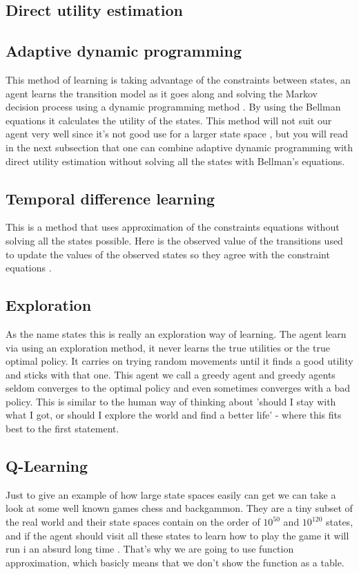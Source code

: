 			
\subsection*{Direct utility estimation}


\subsection*{Adaptive dynamic programming}\label{ADP}
This method of learning is taking advantage of the constraints between states, an agent learns the transition model as it goes along and solving the Markov decision process \cite{mdp} using a dynamic programming method \cite{dp}. By using the Bellman equations it calculates the utility of the states. This method will not suit our agent very well since it's not good use for a larger state space \cite[p. 767]{rl}, but you will read in the next subsection that one can combine adaptive dynamic programming with direct utility estimation without solving all the states with Bellman's equations. 

\subsection*{Temporal difference learning} 
This is a method that uses approximation of the constraints equations without solving all the states possible. Here is the observed value of the transitions used to update the values of the observed states so they agree with the constraint equations \cite[p. 767]{rl}. 

\subsection*{Exploration}
As the name states this is really an exploration way of learning. The agent learn via using an exploration method, it never learns the true utilities or the true optimal policy. It carries on trying random movements until it finds a good utility and sticks with that one. This agent we call a greedy agent and greedy agents seldom converges to the optimal policy and even sometimes converges with a bad policy. This is similar to the human way of thinking about 'should I stay with what I got, or should I explore the world and find a better life' - where this fits best to the first statement. \cite[p. 771]{rl}

\subsection*{Q-Learning}	\label{qlearning}
Just to give an example of how large state spaces easily can get we can take a look at some well known games chess and backgammon. They are a tiny subset of the real world and their state spaces contain on the order of $10^{50}$ and $10^{120}$ states, and if the agent should visit all these states to learn how to play the game it will run i an absurd long time \cite[p. 777]{rl}. That's why we are going to use function approximation, which basicly means that we don't show the function as a table.

